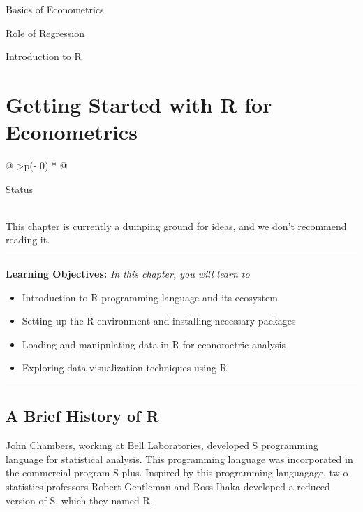 \documentclass[
  letterpaper,
  twoside,
  openright,
  headsepline,
  footsepline,
  listof = totocnumbered,
  chapterprefix = true,
  titlepage = false]{scrbook}
\providecommand{\abstractname}{Learning Objectives} %
\newenvironment{objectives}[1]{%
	\hrule
	\vspace{5pt}
	\small\textbf{\abstractname: } 
	\newline
	\vspace{0.1cm}
	\small\emph{#1} %
	\itshape %
}{%
	\vspace{5pt}
	\hrule
	\vspace{0.6cm}
}
\begin{document}
Basics of Econometrics

Role of Regression

Introduction to R


\hypertarget{getting-started-with-r-for-econometrics}{%
\chapter{Getting Started with R for
Econometrics}\label{getting-started-with-r-for-econometrics}}

\begin{longtable}[]{@{}
  >{\centering\arraybackslash}p{(\columnwidth - 0\tabcolsep) * }@{}}
\toprule\noalign{}
\begin{minipage}[b]{\linewidth}\centering
Status
\end{minipage} \\
\midrule\noalign{}
\endhead
\bottomrule\noalign{}
\endlastfoot
This chapter is currently a dumping ground for ideas, and we don't
recommend reading it. \\
\end{longtable}

\begin{objectives}{In this chapter, you will learn to}
\begin{itemize}

\item{Introduction to R programming language and its ecosystem}

\item{Setting up the R environment and installing necessary packages}

\item{Loading and manipulating data in R for econometric analysis}

\item{Exploring data visualization techniques using R}

\end{itemize}

\end{objectives}

\hypertarget{a-brief-history-of-r}{%
\section{A Brief History of R}\label{a-brief-history-of-r}}

John Chambers, working at Bell Laboratories, developed S programming
language for statistical analysis. This programming language was
incorporated in the commercial program S-plus. Inspired by this
programming languagage, tw o statistics professors Robert Gentleman and
Ross Ihaka developed a reduced version of S, which they named R.
\end{document}
